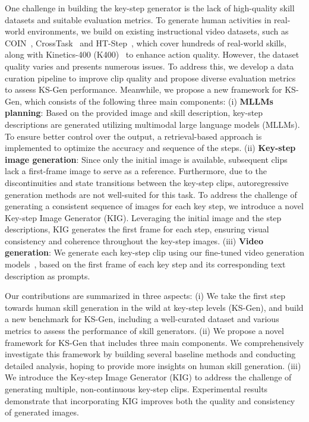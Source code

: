 One challenge in building the key-step generator is the lack of high-quality skill datasets and suitable evaluation metrics. To generate human activities in real-world environments, we build on existing instructional video datasets, such as COIN~\cite{COIN}, CrossTask~\cite{crosstask} and HT-Step~\cite{htstep}, which cover hundreds of real-world skills, along with Kinetics-400 (K400)~\cite{k400} to enhance action quality. However, the dataset quality varies and presents numerous issues. To address this, we develop a data curation pipeline to improve clip quality and propose diverse evaluation metrics to assess KS-Gen performance. Meanwhile, we propose a new framework for KS-Gen, which consists of the following three main components: (i) \textbf{MLLMs planning}: Based on the provided image and skill description, key-step descriptions are generated utilizing multimodal large language models (MLLMs). To ensure better control over the output, a retrieval-based approach is implemented to optimize the accuracy and sequence of the steps. (ii) \textbf{Key-step image generation}: Since only the initial image is available, subsequent clips lack a first-frame image to serve as a reference. Furthermore, due to the discontinuities and state transitions between the key-step clips, autoregressive generation methods are not well-suited for this task. To address the challenge of generating a consistent sequence of images for each key step, we introduce a novel Key-step Image Generator (KIG). Leveraging the initial image and the step descriptions, KIG generates the first frame for each step, ensuring visual consistency and coherence throughout the key-step images. (iii) \textbf{Video generation}: We generate each key-step clip using our fine-tuned video generation models~\cite{aa,SVD,dynamicrafter,cogvideox}, based on the first frame of each key step and its corresponding text description as prompts.

Our contributions are summarized in three aspects: (i) We take the first step towards human skill generation in the wild at key-step levels (KS-Gen), and build a new benchmark for KS-Gen, including a well-curated dataset and various metrics to assess the performance of skill generators. (ii) We propose a novel framework for KS-Gen that includes three main components. We comprehensively investigate this framework by building several baseline methods and conducting detailed analysis, hoping to provide more insights on human skill generation. (iii) We introduce the Key-step Image Generator (KIG) to address the challenge of generating multiple, non-continuous key-step clips. Experimental results demonstrate that incorporating KIG improves both the quality and consistency of generated images.

